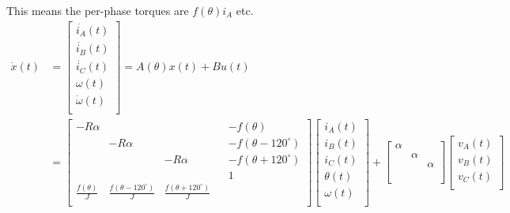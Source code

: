 \documentclass[fleqn]{article}
\begin{document}
\begin{flushleft}
This means the per-phase torques are $f(\theta) i_A$ etc.
\\
\begin{align*}
\dot{x}(t) &=
  \begin{bmatrix}
    \dot{i_A}(t) \\
    \dot{i_B}(t) \\
    \dot{i_C}(t) \\
    \omega(t) \\
    \dot\omega(t) \\
  \end{bmatrix}
  = A(\theta) x(t) + B u(t)
\\ &=
  \begin{bmatrix}
    -R \alpha &           &           & & -f(\theta)               \\
              & -R \alpha &           & & -f(\theta - 120^{\circ}) \\
              &           & -R \alpha & & -f(\theta + 120^{\circ}) \\
              &           &           & & 1                        \\
    \frac{f(\theta)}{J} & \frac{f(\theta - 120^{\circ})}{J} &
          \frac{f(\theta + 120^{\circ})}{J} & & \\
  \end{bmatrix}
  \begin{bmatrix}
    i_A(t) \\
    i_B(t) \\
    i_C(t) \\
    \theta(t) \\
    \omega(t) \\
  \end{bmatrix}
  +
  \begin{bmatrix}
    \alpha &        &        \\
           & \alpha &        \\
           &        & \alpha \\
           &        &        \\
           &        &        \\
  \end{bmatrix}
  \begin{bmatrix}
    v_A(t) \\
    v_B(t) \\
    v_C(t) \\
  \end{bmatrix}
\end{align*}
\\

\end{flushleft}
\end{document}
